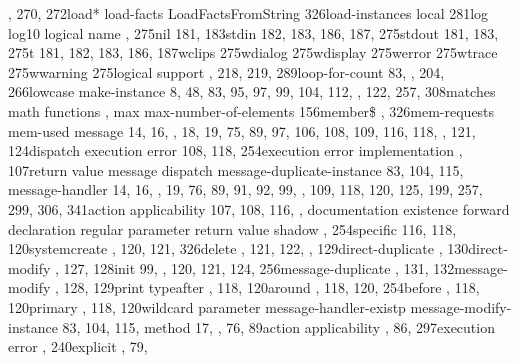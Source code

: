 \documentclass[letterpaper,10pt,english]{sphinxmanual}
\begin{document}
, 270, 272load* load-facts LoadFactsFromString
326load-instances local 281log log10 logical
name , 275nil 181, 183stdin 182, 183, 186, 187, 275stdout 181,
183, 275t 181, 182, 183, 186, 187wclips 275wdialog 275wdisplay 275werror
275wtrace 275wwarning 275logical support , 218, 219,
289loop-for-count 83, , 204, 266lowcase make-instance 8,
48, 83, 95, 97, 99, 104, 112, , 122, 257, 308matches
math functions , max
max-number-of-elements 156member\$ , 326mem-requests
mem-used message 14, 16, , 18, 19, 75, 89, 97,
106, 108, 109, 116, 118, , 121, 124dispatch execution
error 108, 118, 254execution error implementation ,
107return value message dispatch
message-duplicate-instance 83, 104, 115,
message-handler 14, 16, , 19, 76, 89, 91, 92, 99,
, 109, 118, 120, 125, 199, 257, 299, 306, 341action
applicability 107, 108, 116, , documentation
existence forward declaration regular
parameter return value shadow , 254specific
116, 118, 120systemcreate , 120, 121, 326delete , 121,
122, , 129direct-duplicate , 130direct-modify ,
127, 128init 99, , 120, 121, 124, 256message-duplicate ,
131, 132message-modify , 128, 129print typeafter
, 118, 120around , 118, 120, 254before , 118,
120primary , 118, 120wildcard parameter
message-handler-existp message-modify-instance 83,
104, 115, method 17, , 76, 89action applicability
, 86, 297execution error , 240explicit , 79,
\end{document}
